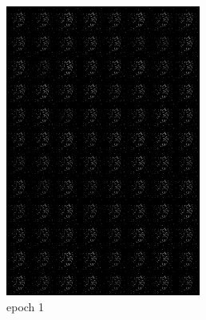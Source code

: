 \documentclass[a4paper]{article}
\theoremstyle{definition}
\newenvironment{soln}{
	\leavevmode\color{blue}\ignorespaces
}{}
\begin{document}
\begin{enumerate} [label=(\alph*)]
\begin{soln}
			\begin{figure}[H]
				\centering
				\begin{subfigure}[b]{0.3\textwidth}
					\centering
					\includegraphics[width=\textwidth]{outputs/c.gen_img1.png}
					\caption{epoch 1}
				\end{subfigure}
				\hfill
				\begin{subfigure}[b]{0.3\textwidth}
					\centering

\end{subfigure}
\end{figure}
\end{soln}
\end{enumerate}
\end{document}
